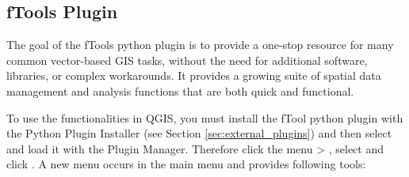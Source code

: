 \subsection{fTools Plugin}\label{sec:ftools}

\updatedisclaimer

The goal of the fTools python plugin is to provide a one-stop resource for
many common vector-based GIS tasks, without the need for additional software, 
libraries, or complex workarounds. It provides a growing suite of spatial 
data management and analysis functions that are both quick and functional. 


To use the functionalities in QGIS, you must install the fTool python plugin
with the Python Plugin Installer (see Section \ref{sec:external_plugins}) and
then select and load it with the Plugin Manager. Therefore click the menu 
 > , select
 and click . A new menu 
occurs in the main menu and provides following tools:


